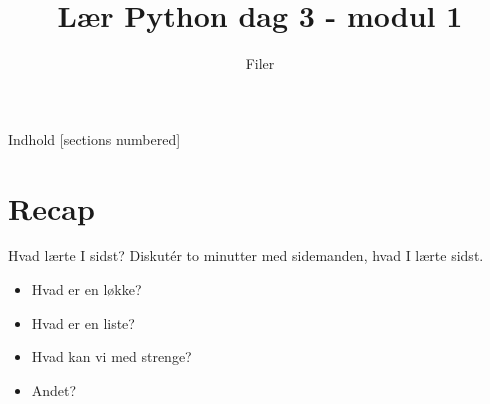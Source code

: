 

\title{Lær Python dag 3 - modul 1}
\subtitle{Filer}



\maketitle

\begin{frame}{Indhold}
  [sections numbered]
  \tableofcontents[hideallsubsections]
\end{frame}

\section{Recap}
\begin{frame}[fragile]{Hvad lærte I sidst?}
	Diskutér to minutter med sidemanden, hvad I lærte sidst.
	
	\begin{itemize}
		\item Hvad er en løkke?
		\item Hvad er en liste?
		\item Hvad kan vi med strenge?
		\item Andet?
	\end{itemize}
\end{frame}

